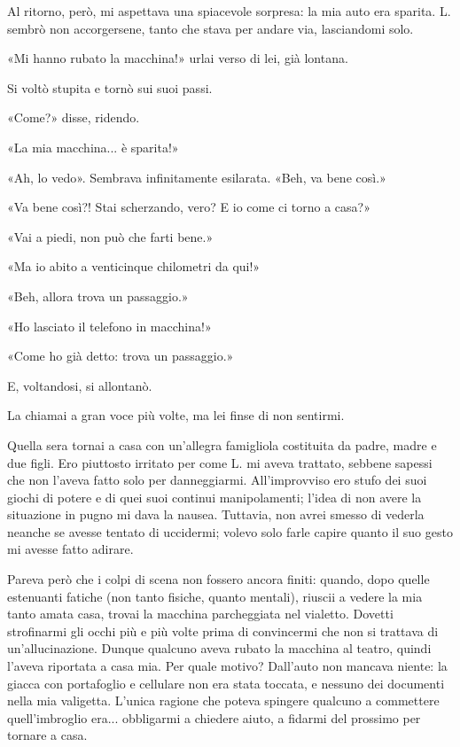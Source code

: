 \documentclass[a4paper,12pt]{book}
\begin{document}
Al ritorno, però, mi aspettava una spiacevole sorpresa: la mia auto era
sparita. L. sembrò non accorgersene, tanto che stava per andare via,
lasciandomi solo.

«Mi hanno rubato la macchina!» urlai verso di lei, già lontana.

Si voltò stupita e tornò sui suoi passi.

«Come?» disse, ridendo.

«La mia macchina... è sparita!»

«Ah, lo vedo». Sembrava infinitamente esilarata. «Beh, va bene così.»

«Va bene così?! Stai scherzando, vero? E io come ci torno a casa?»

«Vai a piedi, non può che farti bene.»

«Ma io abito a venticinque chilometri da qui!»

«Beh, allora trova un passaggio.»

«Ho lasciato il telefono in macchina!»

«Come ho già detto: trova un passaggio.»

E, voltandosi, si allontanò.

La chiamai a gran voce più volte, ma lei finse di non sentirmi.

Quella sera tornai a casa con un’allegra famigliola costituita da padre, madre
e due figli. Ero piuttosto irritato per come L. mi aveva trattato, sebbene
sapessi che non l’aveva fatto solo per danneggiarmi. All’improvviso ero
stufo dei suoi giochi di potere e di quei suoi continui manipolamenti; l’idea
di non avere la situazione in pugno mi dava la nausea. Tuttavia, non avrei
smesso di vederla neanche se avesse tentato di uccidermi; volevo solo farle
capire quanto il suo gesto mi avesse fatto adirare.

Pareva però che i colpi di scena non fossero ancora finiti: quando, dopo quelle
estenuanti fatiche (non tanto fisiche, quanto mentali), riuscii a vedere la mia
tanto amata casa, trovai la macchina parcheggiata nel vialetto. Dovetti
strofinarmi gli occhi più e più volte prima di convincermi che non si trattava
di un’allucinazione. Dunque qualcuno aveva rubato la macchina al teatro,
quindi l’aveva riportata a casa mia. Per quale motivo? Dall’auto non mancava
niente: la giacca con portafoglio e cellulare non era stata toccata, e nessuno
dei documenti nella mia valigetta. L’unica ragione che poteva spingere
qualcuno a commettere quell’imbroglio era... obbligarmi a chiedere aiuto, a
fidarmi del prossimo per tornare a casa.
\end{document}

